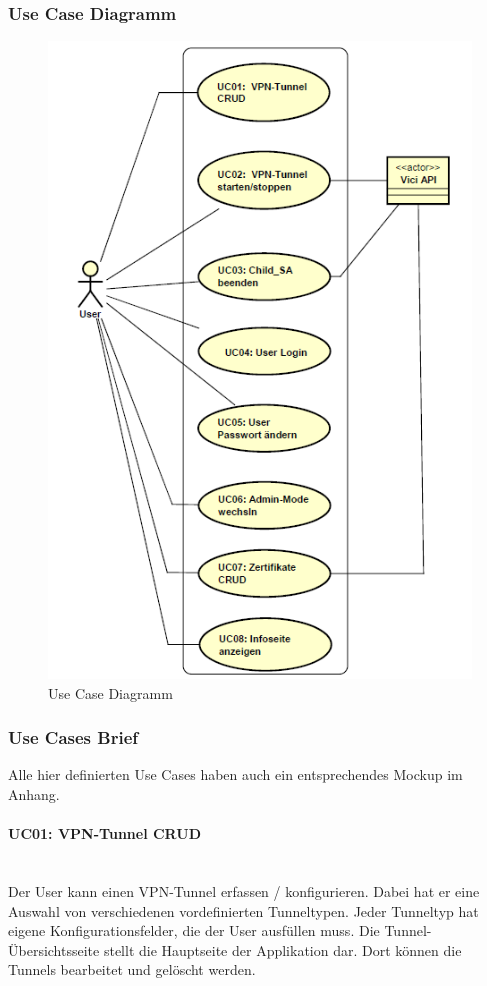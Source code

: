 \subsubsection{Use Case Diagramm}
\begin{figure}[H]
\centering
\includegraphics[width=420pt]{images/strongMan_usecase.png}
\caption[Use Case Diagramm]{Use Case Diagramm}
\end{figure}


\subsubsection{Use Cases Brief}
Alle hier definierten Use Cases haben auch ein entsprechendes Mockup im Anhang.
\paragraph{UC01: VPN-Tunnel CRUD}\mbox{} \\
Der User kann einen VPN-Tunnel erfassen / konfigurieren. Dabei hat er eine Auswahl von verschiedenen vordefinierten Tunneltypen. Jeder Tunneltyp hat eigene Konfigurationsfelder, die der User ausfüllen muss. Die Tunnel-Übersichtsseite stellt die Hauptseite der Applikation dar. Dort können die Tunnels bearbeitet und gelöscht werden.

